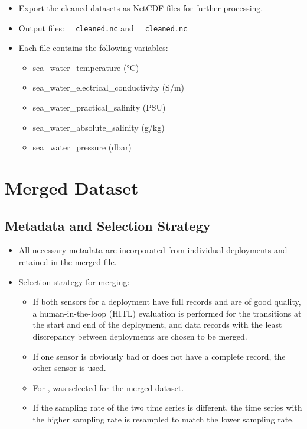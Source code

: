 \begin{itemize}
\item Export the cleaned datasets as NetCDF files for further processing.
\item Output files: 
\texttt{\projectname\casenumber\_\FirstInstrument\_cleaned.nc} 
and \texttt{\projectname\casenumber\_\SecondInstrument\_cleaned.nc}
\item Each file contains the following variables:
\begin{itemize}
    \item sea\_water\_temperature (°C)
    \item sea\_water\_electrical\_conductivity (S/m)
    \item sea\_water\_practical\_salinity (PSU)
    \item sea\_water\_absolute\_salinity (g/kg)
    \item sea\_water\_pressure (dbar)
\end{itemize}
\end{itemize}   

\section{Merged Dataset}

\subsection{Metadata and Selection Strategy}
\begin{itemize}
    \item All necessary metadata are incorporated from individual deployments and retained in the merged file.
    \item Selection strategy for merging:
    \begin{itemize}
        \item If both sensors for a deployment have full records and are of good quality, 
        a human-in-the-loop (HITL) evaluation is performed for the transitions at the start and end of the deployment, 
        and data records with the least discrepancy between deployments are chosen to be merged. 
        \item If one sensor is obviously bad or does not have a complete record, the other sensor is used.
        \item For \projectname{} \casenumber{}, \CurrentDeploymentInstrument{} was selected for the merged dataset.
        \item If the sampling rate of the two time series is different, the time series with the higher sampling rate is resampled to match the lower sampling rate.
    \end{itemize}
\end{itemize}

